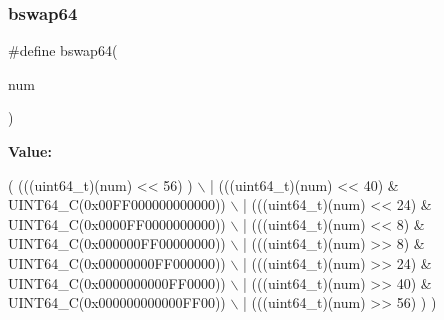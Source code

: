 \subsubsection{bswap64}
{\footnotesize\ttfamily \#define bswap64(\begin{DoxyParamCaption}\item[{}]{num }\end{DoxyParamCaption})}

{\bfseries Value\+:}
\begin{DoxyCode}
( (((uint64\_t)(num) << 56)                               ) \(\backslash\)
                | (((uint64\_t)(num) << 40) & UINT64\_C(0x00FF000000000000)) \(\backslash\)
                | (((uint64\_t)(num) << 24) & UINT64\_C(0x0000FF0000000000)) \(\backslash\)
                | (((uint64\_t)(num) <<  8) & UINT64\_C(0x000000FF00000000)) \(\backslash\)
                | (((uint64\_t)(num) >>  8) & UINT64\_C(0x00000000FF000000)) \(\backslash\)
                | (((uint64\_t)(num) >> 24) & UINT64\_C(0x0000000000FF0000)) \(\backslash\)
                | (((uint64\_t)(num) >> 40) & UINT64\_C(0x000000000000FF00)) \(\backslash\)
                | (((uint64\_t)(num) >> 56)                               ) )
\end{DoxyCode}
